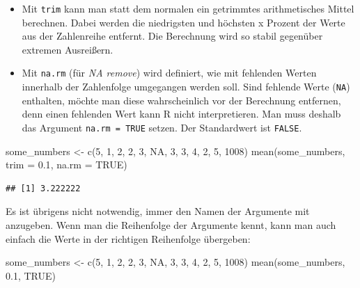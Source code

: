 \documentclass[
]{book}
\newenvironment{Shaded}{\begin{snugshade}}{\end{snugshade}}
\newcommand{\AttributeTok}[1]{\textcolor[rgb]{0.77,0.63,0.00}{#1}}
\newcommand{\ConstantTok}[1]{\textcolor[rgb]{0.00,0.00,0.00}{#1}}
\newcommand{\DecValTok}[1]{\textcolor[rgb]{0.00,0.00,0.81}{#1}}
\newcommand{\FloatTok}[1]{\textcolor[rgb]{0.00,0.00,0.81}{#1}}
\newcommand{\FunctionTok}[1]{\textcolor[rgb]{0.00,0.00,0.00}{#1}}
\newcommand{\NormalTok}[1]{#1}
\newcommand{\OtherTok}[1]{\textcolor[rgb]{0.56,0.35,0.01}{#1}}
\begin{document}
\begin{itemize}
\item
  Mit \texttt{trim} kann man statt dem normalen ein getrimmtes arithmetisches Mittel berechnen. Dabei werden die niedrigsten und höchsten x Prozent der Werte aus der Zahlenreihe entfernt. Die Berechnung wird so stabil gegenüber extremen Ausreißern.
\item
  Mit \texttt{na.rm} (für \emph{NA remove}) wird definiert, wie mit fehlenden Werten innerhalb der Zahlenfolge umgegangen werden soll. Sind fehlende Werte (\texttt{NA}) enthalten, möchte man diese wahrscheinlich vor der Berechnung entfernen, denn einen fehlenden Wert kann R nicht interpretieren. Man muss deshalb das Argument \texttt{na.rm\ =\ TRUE} setzen. Der Standardwert ist \texttt{FALSE}.
\end{itemize}

\begin{Shaded}
\begin{Highlighting}[]
\NormalTok{some\_numbers }\OtherTok{\textless{}{-}} \FunctionTok{c}\NormalTok{(}\DecValTok{5}\NormalTok{, }\DecValTok{1}\NormalTok{, }\DecValTok{2}\NormalTok{, }\DecValTok{2}\NormalTok{, }\DecValTok{3}\NormalTok{, }\ConstantTok{NA}\NormalTok{, }\DecValTok{3}\NormalTok{, }\DecValTok{3}\NormalTok{, }\DecValTok{4}\NormalTok{, }\DecValTok{2}\NormalTok{, }\DecValTok{5}\NormalTok{, }\DecValTok{1008}\NormalTok{)}
\FunctionTok{mean}\NormalTok{(some\_numbers, }\AttributeTok{trim =} \FloatTok{0.1}\NormalTok{, }\AttributeTok{na.rm =} \ConstantTok{TRUE}\NormalTok{)}
\end{Highlighting}
\end{Shaded}

\begin{verbatim}
## [1] 3.222222
\end{verbatim}

Es ist übrigens nicht notwendig, immer den Namen der Argumente mit anzugeben. Wenn man die Reihenfolge der Argumente kennt, kann man auch einfach die Werte in der richtigen Reihenfolge übergeben:

\begin{Shaded}
\begin{Highlighting}[]
\NormalTok{some\_numbers }\OtherTok{\textless{}{-}} \FunctionTok{c}\NormalTok{(}\DecValTok{5}\NormalTok{, }\DecValTok{1}\NormalTok{, }\DecValTok{2}\NormalTok{, }\DecValTok{2}\NormalTok{, }\DecValTok{3}\NormalTok{, }\ConstantTok{NA}\NormalTok{, }\DecValTok{3}\NormalTok{, }\DecValTok{3}\NormalTok{, }\DecValTok{4}\NormalTok{, }\DecValTok{2}\NormalTok{, }\DecValTok{5}\NormalTok{, }\DecValTok{1008}\NormalTok{)}
\FunctionTok{mean}\NormalTok{(some\_numbers, }\FloatTok{0.1}\NormalTok{, }\ConstantTok{TRUE}\NormalTok{)}
\end{Highlighting}
\end{Shaded}
\end{document}
